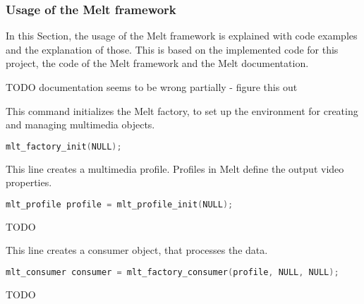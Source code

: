 \documentclass[../MasterThesis.tex]{subfiles}
\begin{document}
\subsubsection*{Usage of the Melt framework}


In this Section, the usage of the Melt framework is explained with code examples and the explanation of those. This is based on the implemented code for this project, the code of the Melt framework and the Melt documentation.~\cite{melt}

TODO documentation seems to be wrong partially - figure this out

\begin{description}[font=\normalfont\color{RedViolet!80!black}, style=nextline]
	
	\item[Initialise the factory] 
	
	This command initializes the Melt factory, to set up the environment for creating and managing multimedia objects.
	
	\begin{lstlisting}[language=C, numbers=none, basicstyle=\scriptsize\ttfamily]
	mlt_factory_init(NULL); \end{lstlisting}
	
	
	\item[Create a profile] 
	
	This line creates a multimedia profile. Profiles in Melt define the output video properties.
	
	\begin{lstlisting}[language=C, numbers=none, basicstyle=\scriptsize\ttfamily]
	mlt_profile profile = mlt_profile_init(NULL); \end{lstlisting}
	
	
	\item[Create a consumer] TODO
	
	This line creates a consumer object, that processes the data.
	
	\begin{lstlisting}[language=C, numbers=none, basicstyle=\scriptsize\ttfamily]
	mlt_consumer consumer = mlt_factory_consumer(profile, NULL, NULL); \end{lstlisting}
	
	
	\item[Create a producer] TODO
	

\end{description}
\end{document}
